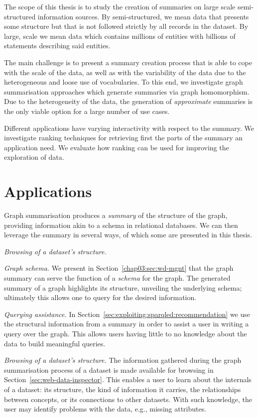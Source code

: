 The scope of this thesis is to study the creation of summaries on large scale semi-structured information sources. By semi-structured, we mean data that presents some structure but that is not followed strictly by all records in the dataset. By large, scale we mean data which contains millions of entities with billions of statements describing said entities.

The main challenge is to present a summary creation process that is able to cope with the scale of the data, as well as with the variability of the data due to the heterogeneous and loose use of vocabularies. To this end, we investigate graph summarisation approaches which generate summaries via graph homomorphism. Due to the heterogeneity of the data, the generation of \emph{approximate} summaries is the only viable option for a large number of use cases.

Different applications have varying interactivity with respect to the summary. We investigate ranking techniques for retrieving first the parts of the summary an application need. We evaluate how ranking can be used for improving the exploration of data.

\section{Applications}

Graph summarisation produces a \emph{summary} of the structure of the graph, providing information akin to a schema in relational databases. We can then leverage the summary in several ways, of which some are presented in this thesis.

\begin{labeling}{\emph{Browsing of a dataset's structure.}}
\item[\emph{Graph schema.}] We present in Section~\ref{chap03:sec:wd-mgnt} that the graph summary can serve the function of a \emph{schema} for the graph. The generated summary of a graph highlights its structure, unveiling the underlying schema; ultimately this allows one to query for the desired information.
\item[\emph{Querying assistance.}] In Section~\ref{sec:exploiting:sparqled:recommendation} we use the structural information from a summary in order to assist a user in writing a query over the graph. This allows users having little to no knowledge about the data to build meaningful queries.
\item[\emph{Browsing of a dataset's structure.}] The information gathered during the graph summarisation process of a dataset is made available for browsing in Section~\ref{sec:web-data-inspector}. This enables a user to learn about the internals of a dataset: its structure, the kind of information it carries, the relationships between concepts, or its connections to other datasets. With such knowledge, the user may identify problems with the data, e.g., missing attributes.
\end{labeling}


